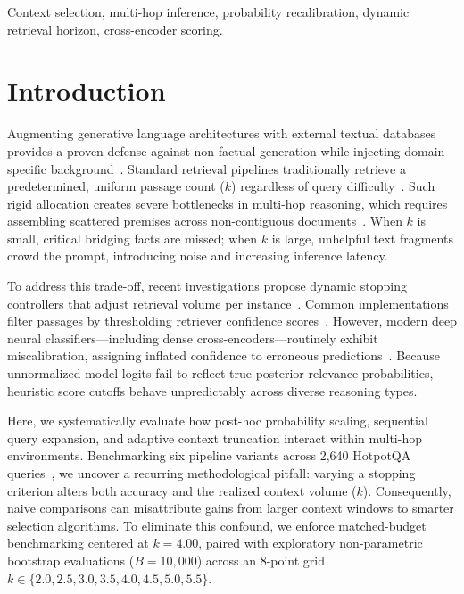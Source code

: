 \documentclass[conference]{IEEEtran}
\begin{document}
\begin{IEEEkeywords}
Context selection, multi-hop inference, probability recalibration, dynamic retrieval horizon, cross-encoder scoring.
\end{IEEEkeywords}

\section{Introduction}
\label{sec:intro}
Augmenting generative language architectures with external textual databases provides a proven defense against non-factual generation while injecting domain-specific background~\cite{collini2025carag,asai2024selfrag}. Standard retrieval pipelines traditionally retrieve a predetermined, uniform passage count ($k$) regardless of query difficulty~\cite{kratzwald2018adaptive,jeong2024adaptiverag}. Such rigid allocation creates severe bottlenecks in multi-hop reasoning, which requires assembling scattered premises across non-contiguous documents~\cite{yang2018hotpotqa}. When $k$ is small, critical bridging facts are missed; when $k$ is large, unhelpful text fragments crowd the prompt, introducing noise and increasing inference latency.

To address this trade-off, recent investigations propose dynamic stopping controllers that adjust retrieval volume per instance~\cite{kratzwald2018adaptive,jeong2024adaptiverag,wang2024targ,liu2024ctrla}. Common implementations filter passages by thresholding retriever confidence scores~\cite{collini2025carag}. However, modern deep neural classifiers—including dense cross-encoders—routinely exhibit miscalibration, assigning inflated confidence to erroneous predictions~\cite{guo2017calibration}. Because unnormalized model logits fail to reflect true posterior relevance probabilities, heuristic score cutoffs behave unpredictably across diverse reasoning types.

Here, we systematically evaluate how post-hoc probability scaling, sequential query expansion, and adaptive context truncation interact within multi-hop environments. Benchmarking six pipeline variants across 2,640 HotpotQA queries~\cite{yang2018hotpotqa}, we uncover a recurring methodological pitfall: varying a stopping criterion alters both accuracy and the realized context volume ($k$). Consequently, naive comparisons can misattribute gains from larger context windows to smarter selection algorithms. To eliminate this confound, we enforce matched-budget benchmarking centered at $k = 4.00$, paired with exploratory non-parametric bootstrap evaluations ($B=10{,}000$) across an 8-point grid $k \in \{2.0, 2.5, 3.0, 3.5, 4.0, 4.5, 5.0, 5.5\}$.
\end{document}
